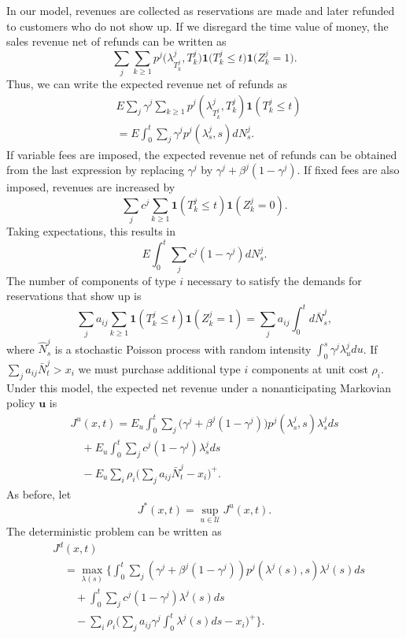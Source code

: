 In our model, revenues are collected as reservations are made and later refunded to customers who do not show up. If we disregard the time value of money, the sales revenue net of refunds can be written as
\[
\sum_{j} \sum_{k \geqslant 1} p^{j} \big( \lambda_{T_k^{j}}^{j}, T_k^{j} \big) \mathbf{1} \big( T_k^{j} \leqslant t \big) \mathbf{1} \big( Z_k^{j} = 1 \big) .
\]
Thus, we can write the expected revenue net of refunds as
\[
\begin{array}{rl}
& E \sum_{j} \gamma^{j} \sum_{k \geqslant 1} p^{j} (\lambda_{T_k^{j}}^{j}, T_k^{j}) \mathbf{1} (T_k^{j} \leqslant t) \\
& = E \int_{0}^{t} \sum_{j} \gamma^{j} p^{j} (\lambda_s^{j}, s) dN_s^{j} .
\end{array}
\]
If variable fees are imposed, the expected revenue net of refunds can be obtained from the last expression by replacing \(\gamma^{j}\) by \(\gamma^{j} + \beta^{j} (1 - \gamma^{j})\). If fixed fees are also imposed, revenues are increased by
\[
\sum_{j} c^{j} \sum_{k \geqslant 1} \mathbf{1} (T_k^{j} \leqslant t) \mathbf{1} (Z_k^{j} = 0) .
\]
Taking expectations, this results in
\[
E \int_{0}^{t} \sum_{j} c^{j} (1 - \gamma^{j})  dN_s^{j} .
\]
The number of components of type \(i\) necessary to satisfy the demands for reservations that show up is
\[
\sum_{j} a_{ij} \sum_{k \geqslant 1} \mathbf{1} (T_k^{j} \leqslant t) \mathbf{1} (Z_k^{j} = 1) = \sum_{j} a_{ij} \int_{0}^{t} d \bar{N}_s^{j} ,
\]
where \(\hat{N}_s^{j}\) is a stochastic Poisson process with random intensity \(\int_{0}^{s} \gamma^{j} \lambda_u^{j} du\). If \(\sum_{j} a_{ij} \bar{N}_t^{j} > x_i\) we must purchase additional type \(i\) components at unit cost \(\rho_i\). Under this model, the expected net revenue under a nonanticipating Markovian policy \(\boldsymbol{u}\) is
\[
\begin{array}{l}
\displaystyle J^{u} (x, t) = E_u \int_{0}^{t} \sum_{j} \big( \gamma^{j} + \beta^{j} (1 - \gamma^{j}) \big) p^{j} (\lambda_s^{j}, s) \lambda_s^{j} ds \\
\displaystyle \quad + E_u \int_{0}^{t} \sum_{j} c^{j} (1 - \gamma^{j}) \lambda_s^{j} ds \\
\displaystyle \quad - E_u \sum_{i} \rho_i \Big( \sum_{j} a_{ij} \bar{N}_t^{j} - x_i \Big)^{+} .
\end{array}
\]
As before, let
\[
J^{*} (x, t) = \operatorname*{sup}_{u \in \mathcal{U}} J^{u} (x, t) .
\]
The deterministic problem can be written as
\[
\begin{array}{rl}
& J^{d} (x, t) \\
& \quad = \max_{\lambda(s)} \Bigg\{ \int_{0}^{t} \sum_{j} {(\gamma^{j} + \beta^{j} (1 - \gamma^{j})) p^{j} (\lambda^{j}(s), s) \lambda^{j}(s) ds} \\
& \qquad + \displaystyle \int_{0}^{t} \sum_{j} {c^{j} (1 - \gamma^{j}) \lambda^{j}(s) ds} \\
& \qquad - \sum_{i} \rho_i \bigg( \sum_{j} {a_{ij} \gamma^{j}} \int_{0}^{t} \lambda^{j}(s) ds - x_i \bigg)^{+} \Bigg\} .
\end{array}
\]

